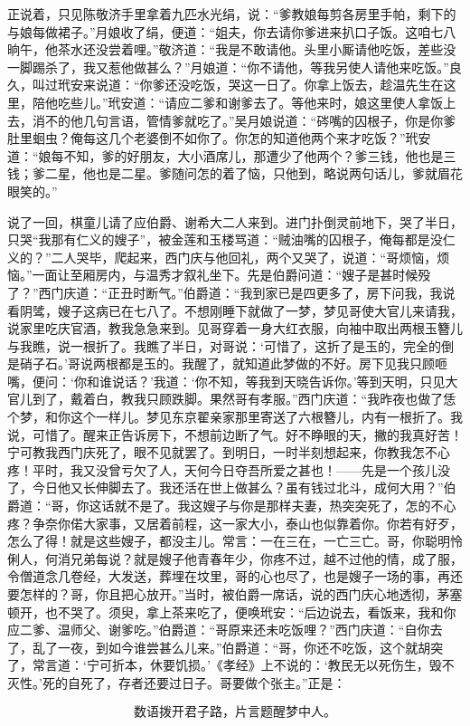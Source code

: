 正说着，只见陈敬济手里拿着九匹水光绢，说：“爹教娘每剪各房里手帕，剩下的与娘每做裙子。”月娘收了绢，便道：“姐夫，你去请你爹进来扒口子饭。这咱七八晌午，他茶水还没尝着哩。”敬济道：“我是不敢请他。头里小厮请他吃饭，差些没一脚踢杀了，我又惹他做甚么？”月娘道：“你不请他，等我另使人请他来吃饭。”良久，叫过玳安来说道：“你爹还没吃饭，哭这一日了。你拿上饭去，趁温先生在这里，陪他吃些儿。”玳安道：“请应二爹和谢爹去了。等他来时，娘这里使人拿饭上去，消不的他几句言语，管情爹就吃了。”吴月娘说道：“硶嘴的囚根子，你是你爹肚里蛔虫？俺每这几个老婆倒不如你了。你怎的知道他两个来才吃饭？”玳安道：“娘每不知，爹的好朋友，大小酒席儿，那遭少了他两个？爹三钱，他也是三钱；爹二星，他也是二星。爹随问怎的着了恼，只他到，略说两句话儿，爹就眉花眼笑的。”

说了一回，棋童儿请了应伯爵、谢希大二人来到。进门扑倒灵前地下，哭了半日，只哭“我那有仁义的嫂子”，被金莲和玉楼骂道：“贼油嘴的囚根子，俺每都是没仁义的？”二人哭毕，爬起来，西门庆与他回礼，两个又哭了，说道：“哥烦恼，烦恼。”一面让至厢房内，与温秀才叙礼坐下。先是伯爵问道：“嫂子是甚时候殁了？”西门庆道：“正丑时断气。”伯爵道：“我到家已是四更多了，房下问我，我说看阴骘，嫂子这病已在七八了。不想刚睡下就做了一梦，梦见哥使大官儿来请我，说家里吃庆官酒，教我急急来到。见哥穿着一身大红衣服，向袖中取出两根玉簪儿与我瞧，说一根折了。我瞧了半日，对哥说：‘可惜了，这折了是玉的，完全的倒是硝子石。’哥说两根都是玉的。我醒了，就知道此梦做的不好。房下见我只顾咂嘴，便问：‘你和谁说话？’我道：‘你不知，等我到天晓告诉你。’等到天明，只见大官儿到了，戴着白，教我只顾跌脚。果然哥有孝服。”西门庆道：“我昨夜也做了恁个梦，和你这个一样儿。梦见东京翟亲家那里寄送了六根簪儿，内有一根\textShiFou 折了。我说，可惜了。醒来正告诉房下，不想前边断了气。好不睁眼的天，撇的我真好苦！宁可教我西门庆死了，眼不见就罢了。到明日，一时半刻想起来，你教我怎不心疼！平时，我又没曾亏欠了人，天何今日夺吾所爱之甚也！——先是一个孩儿没了，今日他又长伸脚去了。我还活在世上做甚么？虽有钱过北斗，成何大用？”伯爵道：“哥，你这话就不是了。我这嫂子与你是那样夫妻，热突突死了，怎的不心疼？争奈你偌大家事，又居着前程，这一家大小，泰山也似靠着你。你若有好歹，怎么了得！就是这些嫂子，都没主儿。常言：一在三在，一亡三亡。哥，你聪明怜俐人，何消兄弟每说？就是嫂子他青春年少，你疼不过，越不过他的情，成了服，令僧道念几卷经，大发送，葬埋在坟里，哥的心也尽了，也是嫂子一场的事，再还要怎样的？哥，你且把心放开。”当时，被伯爵一席话，说的西门庆心地透彻，茅塞顿开，也不哭了。须臾，拿上茶来吃了，便唤玳安：“后边说去，看饭来，我和你应二爹、温师父、谢爹吃。”伯爵道：“哥原来还未吃饭哩？”西门庆道：“自你去了，乱了一夜，到如今谁尝甚么儿来。”伯爵道：“哥，你还不吃饭，这个就胡突了，常言道：‘宁可折本，休要饥损。’《孝经》上不说的：‘教民无以死伤生，毁不灭性。’死的自死了，存者还要过日子。哥要做个张主。”正是：

\[
数语拨开君子路，片言题醒梦中人。
\]

